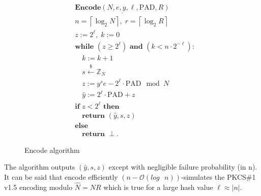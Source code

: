 \documentclass[]{final_report}
\theoremstyle{definition}
\begin{document}
\begin{figure}[H]
\centering
\[
\boxed{
\begin{aligned}
&\underline{\textbf{Encode} (N, e, y, \ell, \text{PAD}, R)} \\
&n = \left\lceil \log_2 N \right\rceil, \; r = \left\lceil \log_2 R \right\rceil \\
&z := 2^\ell, \; k := 0 \\
&\textbf{while } (z \geq 2^\ell) \textbf{ and } (k < n \cdot 2^{-\ell}): \\
&\quad k := k + 1 \\
&\quad s \xleftarrow{\$} \mathbb{Z}_N \\
&\quad z := y^s e - 2^\ell \cdot \text{PAD} \mod N \\
&\quad \widehat{y} := 2^\ell \cdot \text{PAD} + z \\
&\textbf{if } z < 2^\ell \textbf{ then} \\
&\quad \textbf{return } (\widehat{y}, s, z) \\
&\textbf{else} \\
&\quad \textbf{return } \perp.
\end{aligned}
}
\]
\caption{Encode algorithm \cite{jager2018security}}
\label{fig:encode}
\end{figure}

The algorithm outputs \((\widehat{y}, s, z)\) except with negligible failure probability (in n). It can be said that encode efficiently $(n - \mathcal{O}(log \text{ } n))$-simulates the PKCS\#1 v1.5 encoding modulo $\hat{N} = NR$ which is true for a large hash value $\ell \approx |n|$.

\end{document}
